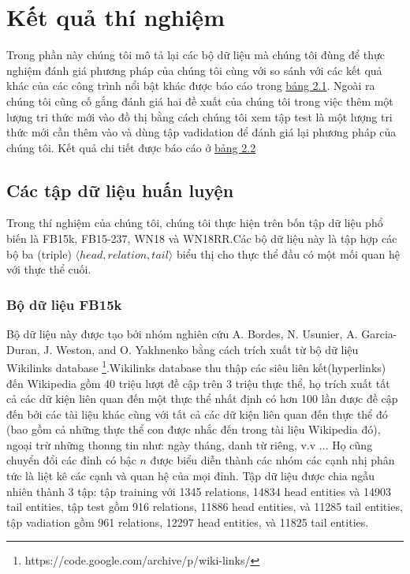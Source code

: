 \chapter{Kết quả thí nghiệm}
\label{Chapter4}

Trong phần này chúng tôi mô tả lại các bộ dữ liệu mà chúng tôi đùng để thực nghiệm đánh giá phương pháp của chúng tôi cùng với so sánh với các kết quả khác của các công trình nổi bật khác được báo cáo trong \hyperref[tab:tab1]{bảng 2.1}. Ngoài ra chúng tôi cũng cố gắng đánh giá hai đề xuất của chúng tôi trong việc thêm một lượng tri thức mới vào đồ thị bằng cách chúng tôi xem tập test là một lượng tri thức mới cần thêm vào và dùng tập vadidation để đánh giá lại phương pháp của chúng tôi. Kết quả chi tiết được báo cáo ở \hyperref[tab:tab1]{bảng 2.2}
\section{Các tập dữ liệu huấn luyện} \label{datasets}
Trong thí nghiệm của chúng tôi, chúng tôi thực hiện trên bốn tập dữ liệu phổ biến là FB15k, FB15-237, WN18 và WN18RR.Các bộ dữ liệu này là tập hợp các bộ ba (triple) \(\langle head, relation, tail \rangle\) biểu thị cho thực thể đầu có một mối quan hệ với thực thể cuối.

\subsection{Bộ dữ liệu FB15k}
Bộ dữ liệu này được tạo bởi nhóm nghiên cứu A. Bordes, N. Usunier, A. Garcia-Duran, J. Weston, and O. Yakhnenko \cite{bordes2013translating} bằng cách trích xuất từ bộ dữ liệu Wikilinks database \footnote{https://code.google.com/archive/p/wiki-links/}.Wikilinks database thu thập các siêu liên kết(hyperlinks) đến Wikipedia gồm 40 triệu lượt đề cập trên 3 triệu thực thể, họ trích xuất tất cả các dữ kiện liên quan đến một thực thể nhất định có hơn 100 lần được đề cập đến bởi các tài liệu khác cùng với tất cả các dữ kiện liên quan đến thực thể đó (bao gồm cả những thực thể con được nhắc đến trong tài liệu Wikipedia đó), ngoại trừ những thonng tin như: ngày tháng, danh từ riêng, v.v ... Họ cũng chuyển đổi các đỉnh có bậc \(n\) được biểu diễn thành các nhóm các cạnh nhị phân tức là liệt kê các cạnh và quan hệ của mọi đỉnh. Tập dữ liệu được chia ngẫu nhiên thành 3 tập: tập training với 1345 relations, 14834 head entities và 14903 tail entities, tập test gồm 916 relations, 11886 head entities, và 11285 tail entities, tập vadiation gồm 961 relations, 12297 head entities, và 11825 tail entities.

